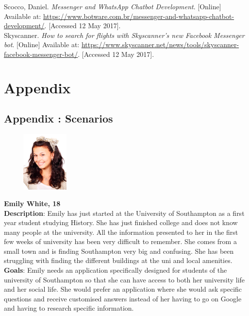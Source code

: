 \documentclass[journal, a4paper]{IEEEtran}
\begin{document}
\begin{thebibliography}{5}
    Scocco, Daniel.
    \emph{Messenger and WhatsApp Chatbot Development}.
    [Online] Available at:
    \url{https://www.botware.com.br/messenger-and-whatsapp-chatbot-development/}.
    [Accessed 12 May 2017].\\
    
    Skyscanner.
    \emph{How to search for flights with Skyscanner's new Facebook Messenger bot}.
    [Online] Available at:
    \url{https://www.skyscanner.net/news/tools/skyscanner-facebook-messenger-bot/}.
    [Accessed 12 May 2017].\\
    
\end{thebibliography}

\section{Appendix}

\subsection{Appendix : Scenarios}

\begin{figure}[H]
	\centering
    \includegraphics[width=0.21\textwidth]{images/em_white}
\end{figure}
\textbf{Emily White, 18}\\
\textbf{Description}: Emily has just started at the University of Southampton as a first year student studying History. She has just finished college and does not know many people at the university. All the information presented to her in the first few weeks of university has been very difficult to remember. She comes from a small town and is finding Southampton very big and confusing. She has been struggling with finding the different buildings at the uni and local amenities.\\ 

\textbf{Goals}: Emily needs an application specifically designed for students of the university of Southampton so that she can have access to both her university life and her social life. She would prefer an application where she would ask specific questions and receive customised answers instead of her having to go on Google and having to research specific information.\\
\end{document}
